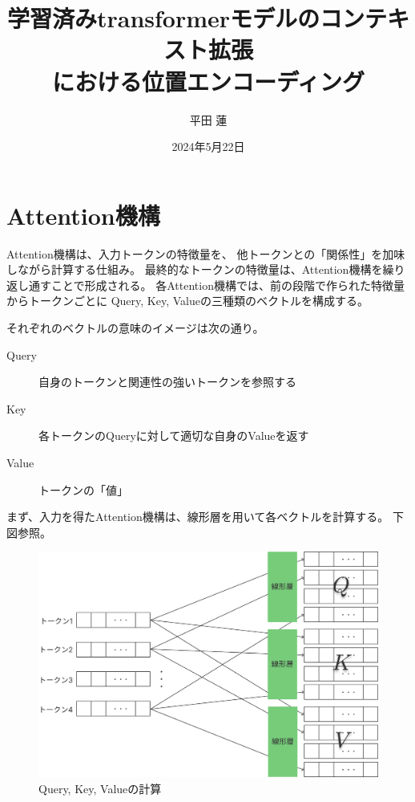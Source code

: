 \documentclass{jsarticle}
\title{
    学習済みtransformerモデルのコンテキスト拡張 \\
    における位置エンコーディング
}
\author{平田 蓮}
\date{2024年5月22日}
\begin{document}
\maketitle

\section{Attention機構}
    Attention機構は、入力トークンの特徴量を、
    他トークンとの「関係性」を加味しながら計算する仕組み。
    最終的なトークンの特徴量は、Attention機構を繰り返し通すことで形成される。
    各Attention機構では、前の段階で作られた特徴量からトークンごとに
    Query, Key, Valueの三種類のベクトルを構成する。

    それぞれのベクトルの意味のイメージは次の通り。
    \begin{description}
        \item[Query] 自身のトークンと関連性の強いトークンを参照する
        \item[Key] 各トークンのQueryに対して適切な自身のValueを返す
        \item[Value] トークンの「値」
    \end{description}

    まず、入力を得たAttention機構は、線形層を用いて各ベクトルを計算する。
    下図参照。
    \begin{figure}[h]
        \centering
        \includegraphics[width=.8\linewidth]{qkv.pdf}
        \caption{Query, Key, Valueの計算}
    \end{figure}
\end{document}
